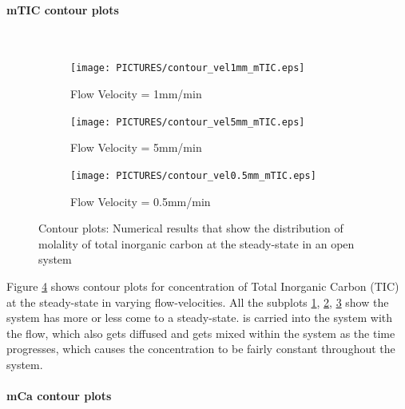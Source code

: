 \paragraph*{mTIC contour plots} \mbox{}\\
\begin{figure}[!h]
\centering
    \begin{subfigure}{.5\linewidth}
        \centering
        \texttt{[image: PICTURES/contour\_vel1mm\_mTIC.eps]}
        \caption{Flow Velocity = 1mm/min}
        \label{fig:TICSteady-state}       %
    \end{subfigure}%
    \hfill
    \begin{subfigure}{.5\linewidth}
        \centering
        \texttt{[image: PICTURES/contour\_vel5mm\_mTIC.eps]}
        \caption{Flow Velocity = 5mm/min}
        \label{fig:TICSteady-state5mm}       %
    \end{subfigure}%
    \hfill
    \begin{subfigure}{.5\linewidth}
        \centering
        \texttt{[image: PICTURES/contour\_vel0.5mm\_mTIC.eps]}
        \caption{Flow Velocity = 0.5mm/min}
        \label{fig:TICSteady-state0.5mm}       %
    \end{subfigure}%
    \caption{\DuMuX Contour plots: Numerical results that show the distribution of molality of total inorganic carbon at the steady-state in an open system}
     \label{fig:contourTIC}
\end{figure}

Figure \ref{fig:contourTIC} shows contour plots for concentration of Total Inorganic Carbon (TIC) at the steady-state in varying flow-velocities. All the subplots \ref{fig:TICSteady-state}, \ref{fig:TICSteady-state5mm}, \ref{fig:TICSteady-state0.5mm} show the system has more or less come to a steady-state.  is carried into the system with the flow, which also gets diffused and gets mixed within the system as the time progresses, which causes the concentration to be fairly constant throughout the system. 


\paragraph*{mCa contour plots} \mbox{}\\

